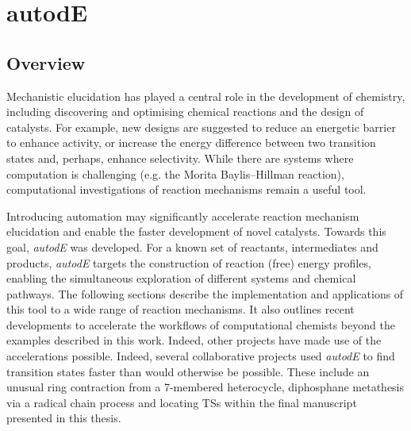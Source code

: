 \documentclass[../../main.tex]{subfiles}
\begin{document}
\setcounter{footnote}{0} 


\chapter{autodE}

\section{Overview}


Mechanistic elucidation has played a central role in the development of chemistry, including discovering and optimising chemical reactions and the design of catalysts. For example, new designs are suggested to reduce an energetic barrier to enhance activity, or increase the energy difference between two transition states and, perhaps, enhance selectivity. While there are systems where computation is challenging (e.g. the Morita Baylis–Hillman reaction\cite{Plata2015}), computational investigations of reaction mechanisms remain a useful tool.

Introducing automation may significantly accelerate reaction mechanism elucidation and enable the faster development of novel catalysts. Towards this goal, \emph{autodE} was developed. For a known set of reactants, intermediates and products,  \emph{autodE} targets the construction of reaction (free) energy profiles, enabling the simultaneous exploration of different systems and chemical pathways. The following sections describe the implementation and applications of this tool to a wide range of reaction mechanisms. It also outlines recent developments to accelerate the workflows of computational chemists beyond the examples described in this work. Indeed, other projects have made use of the accelerations possible. Indeed, several collaborative projects used \emph{autodE} to find transition states faster than would otherwise be possible. These include an unusual ring contraction from a 7-membered heterocycle,\cite{Wang2020} diphosphane metathesis via a radical chain process\cite{Branfoot2021} and locating TSs within the final manuscript presented in this thesis.\cite{Young2021GAP}


\clearpage
\end{document}
